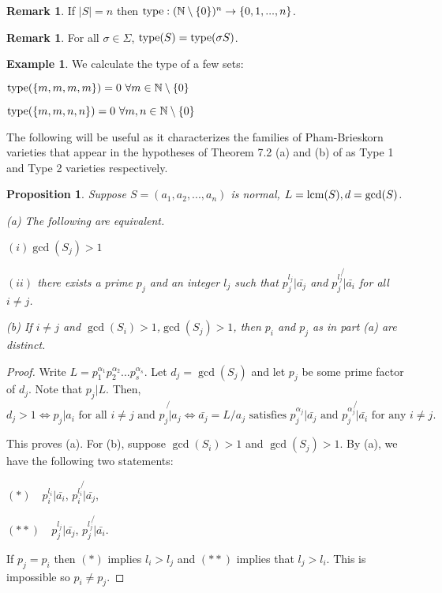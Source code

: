 \documentclass[12pt]{amsart}
\theoremstyle{plain}
\newtheorem{proposition}[subsection]{Proposition}
\theoremstyle{definition}
\newtheorem{example}[subsection]{Example}
\newtheorem{remark}[subsection]{Remark}
\newcommand{\lcm}{		\operatorname{{\rm lcm}}}
\newcommand{\type}{		\operatorname{{\rm type}}}
\newcommand{\Nat}{\ensuremath{\mathbb{N}}}
\begin{document}
\begin{remark}
	
	If $|S| = n$ then $\type : (\Nat \setminus \{0\})^n \to \{0,1,...,n\}$. 
\end{remark}
\begin{remark}
	For all $\sigma \in \Sigma$, $\type(S) = \type(\sigma S) $. 
\end{remark}

\begin{example} We calculate the type of a few sets:
	
	$\type(\{m,m,m,m\}) = 0 \  \forall m \in \Nat \setminus \{0\}$
	
	$\type(\{m,m,n,n\}) = 0 \  \forall m,n \in \Nat \setminus \{0\}$
	
	
\end{example}

The following will be useful as it characterizes the families of Pham-Brieskorn varieties that appear in the hypotheses of Theorem 7.2 (a) and (b) of \cite{daigle:hal-01691491} as Type 1 and Type 2 varieties respectively.  

\begin{proposition}\label{equivalentType}
	Suppose $S = (a_1, a_2, ..., a_n)$ is normal, $L = \lcm (S), d = \gcd(S)$.
	
	(a) The following are equivalent. 
	
	\quad $(i) \gcd(S_j) > 1$
	
	\quad $(ii)$ there exists a prime  $p_j$ and an integer $l_j$  such that $p_j^{l_j} | \bar{a_j}$ and $p_j^{l_j} \not{|} \bar{a_i}$ for all $i \neq j$.
	
	(b) If $i \neq j$ and $\gcd(S_i)>1$,$\gcd(S_j)>1$, then $p_i$ and $p_j$ as in part (a) are distinct.    
\end{proposition}

\begin{proof}
	
	
	Write $L = p_1^{\alpha_1}p_2^{\alpha_2}...p_s^{\alpha_s}$. Let $d_j = \gcd(S_j)$ and let $p_j$ be some prime factor of $d_j$. Note that $p_j | L$. Then, 
	$$d_j > 1  \iff  p_j | a_i \text{ for all $i \neq j$ and $p_j \not{|} a_j$} \iff \bar{a_j} = L / a_j \text{ satisfies  $p_j^{\alpha_j} | \bar{a_j}$ and $p_j^{\alpha_j} \not{|} \bar{a_i}$ for any $i \neq j$}.$$
	
	This proves (a). For (b), suppose $\gcd(S_i) > 1$ and $\gcd(S_j) > 1$. By (a), we have the following two statements:
	
	$(*) \quad p_i^{l_i} | \bar{a_i}$, $p_i^{l_i} \not{|}\bar{a_j}$,
	
	$(**) \quad p_j^{l_j} | \bar{a_j}$, $p_j^{l_j} \not{|}\bar{a_i}$. 
	
	If $p_j = p_i$ then $(*)$ implies $l_i > l_j$ and $(**)$ implies that $l_j > l_i$. This is impossible so $p_i \neq p_j$. 
	
	
\end{proof}
\end{document}
